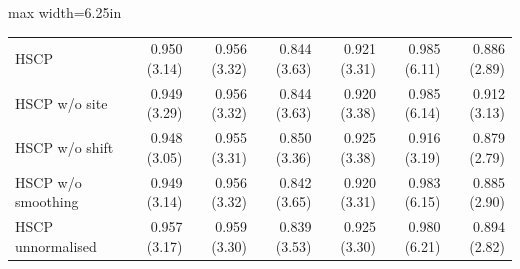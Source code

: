 \begin{table}[htbp]
\begin{adjustbox}{max width=6.25in}
\begin{tabular}{lrrrrrr}
HSCP & 0.950 (3.14) & 0.956 (3.32) & 0.844 (3.63) & 0.921 (3.31) & 0.985 (6.11) & 0.886 (2.89) \\
HSCP w/o site & 0.949 (3.29) & 0.956 (3.32) & 0.844 (3.63) & 0.920 (3.38) & 0.985 (6.14) & 0.912 (3.13) \\
HSCP w/o shift & 0.948 (3.05) & 0.955 (3.31) & 0.850 (3.36) & 0.925 (3.38) & 0.916 (3.19) & 0.879 (2.79) \\
HSCP w/o smoothing & 0.949 (3.14) & 0.956 (3.32) & 0.842 (3.65) & 0.920 (3.31) & 0.983 (6.15) & 0.885 (2.90) \\
HSCP unnormalised & 0.957 (3.17) & 0.959 (3.30) & 0.839 (3.53) & 0.925 (3.30) & 0.980 (6.21) & 0.894 (2.82) \\
\bottomrule
\end{tabular}
\end{adjustbox}
\end{table}
